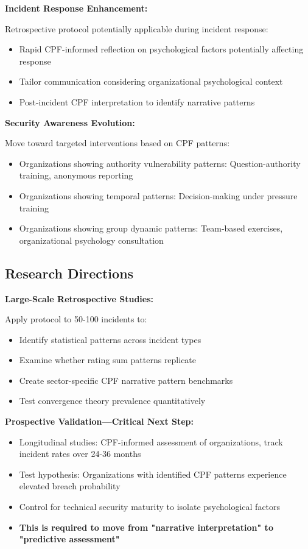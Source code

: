 \documentclass[11pt,a4paper]{article}
\begin{document}
\textbf{Incident Response Enhancement:}

Retrospective protocol potentially applicable during incident response:
\begin{itemize}
\item Rapid CPF-informed reflection on psychological factors potentially affecting response
\item Tailor communication considering organizational psychological context
\item Post-incident CPF interpretation to identify narrative patterns
\end{itemize}

\textbf{Security Awareness Evolution:}

Move toward targeted interventions based on CPF patterns:
\begin{itemize}
\item Organizations showing authority vulnerability patterns: Question-authority training, anonymous reporting
\item Organizations showing temporal patterns: Decision-making under pressure training
\item Organizations showing group dynamic patterns: Team-based exercises, organizational psychology consultation
\end{itemize}

\subsection{Research Directions}

\textbf{Large-Scale Retrospective Studies:}

Apply protocol to 50-100 incidents to:
\begin{itemize}
\item Identify statistical patterns across incident types
\item Examine whether rating sum patterns replicate
\item Create sector-specific CPF narrative pattern benchmarks
\item Test convergence theory prevalence quantitatively
\end{itemize}

\textbf{Prospective Validation—Critical Next Step:}

\begin{itemize}
\item Longitudinal studies: CPF-informed assessment of organizations, track incident rates over 24-36 months
\item Test hypothesis: Organizations with identified CPF patterns experience elevated breach probability
\item Control for technical security maturity to isolate psychological factors
\item \textbf{This is required to move from "narrative interpretation" to "predictive assessment"}
\end{itemize}
\end{document}
